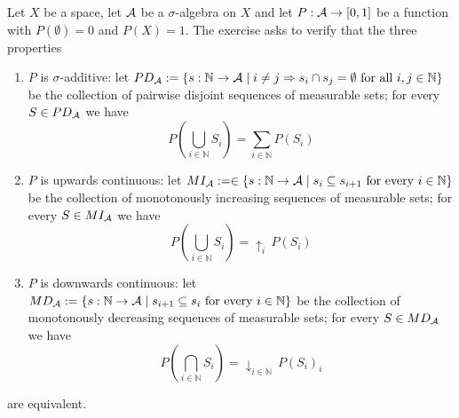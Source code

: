 \documentclass{article}
\begin{document}
\maketitle

\begin{ex}
\newcommand{\ulimsym}{{\uparrow}}
\newcommand{\ulim}[2]{\ulimsym_{#1\in\mathbb{N}}\,{#2}_{#1}}
\newcommand{\dlimsym}{{\downarrow}}
\newcommand{\dlim}[2]{\dlimsym_{#1\in\mathbb{N}}\,{#2}_{#1}}
Let $X$ be a space, let $\mathcal{A}$ be a $\sigma$-algebra on $X$ and
let $P:\mathcal{A}\to[0,1]$ be a function with $P(\emptyset)=0$ and $P(X)=1$. The exercise asks to verify that the three properties
\begin{enumerate}
\item $P$ is $\sigma$-additive: let $PD_\mathcal{A}:=\{s:\mathbb{N}\to\mathcal{A}\mid i\neq j \Rightarrow s_i\cap s_j=\emptyset\text{ for all }i,j\in\mathbb{N}\}$ be the collection of pairwise disjoint sequences of measurable sets; for every $S\in PD_\mathcal{A}$ we have
\begin{equation*}
\textstyle
P(\bigcup_{i\in\mathbb{N}}S_i)=\sum_{i\in\mathbb{N}}P(S_i)
\end{equation*}
\item $P$ is upwards continuous: let $MI_\mathcal{A}:=\in\{s:\mathbb{N}\to\mathcal{A}\mid s_i\subseteq s_{i+1}\text{ for every }i\in\mathbb{N}\}$ be the collection of monotonously increasing sequences of measurable sets; for every $S\in MI_\mathcal{A}$ we have
\begin{equation*}
\textstyle
P(\bigcup_{i\in\mathbb{N}}S_i)=\ulimsym_{i}\,{P(S_i)}
\end{equation*}
\item $P$ is downwards continuous: let $MD_\mathcal{A}:=\{s:\mathbb{N}\to\mathcal{A}\mid s_{i+1}\subseteq s_i\text{ for every }i\in\mathbb{N}\}$ be the collection of monotonously decreasing sequences of measurable sets; for every $S\in MD_\mathcal{A}$ we have
\begin{equation*}
\textstyle
P(\bigcap_{i\in\mathbb{N}}S_i)=\dlim{i}{P(S_i)}
\end{equation*}
\end{enumerate}
are equivalent.


\end{ex}
\end{document}
